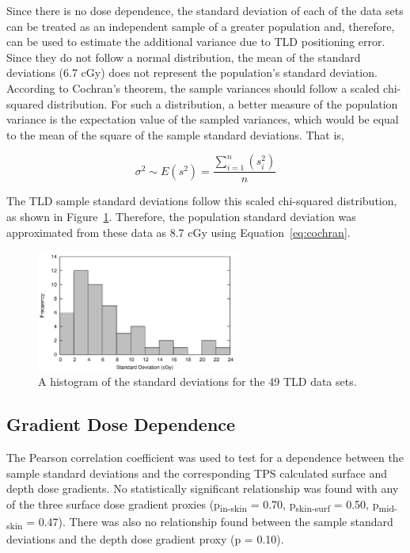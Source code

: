 Since there is no dose dependence, the standard deviation of each of the data sets can be treated as an independent sample of a greater population and, therefore, can be used to estimate the additional variance due to TLD positioning error. Since they do not follow a normal distribution, the mean of the standard deviations (6.7 cGy) does not represent the population’s standard deviation. According to Cochran’s theorem,\cite{Knight1999} the sample variances should follow a scaled chi-squared distribution. For such a distribution, a better measure of the population variance is the expectation value of the sampled variances, which would be equal to the mean of the square of the sample standard deviations. That is,

\begin{equation}
	\label{eq:cochran}
	\sigma^2 \sim E\left(s^2\right) = \frac{\sum_{i=1}^n \left(s_i^2\right)}{n}
\end{equation}

The TLD sample standard deviations follow this scaled chi-squared distribution, as shown in Figure~\ref{fig:p5-stdev_histogram}. Therefore, the population standard deviation was approximated from these data as 8.7 cGy using Equation~\ref{eq:cochran}.

\begin{figure}
	\centering \includegraphics[width=0.6\textwidth]{figures/p5-stdev_histogram.png}
	\caption[A histogram of the standard deviations for the 49 TLD data sets]{\label{fig:p5-stdev_histogram}A histogram of the standard deviations for the 49 TLD data sets.}
\end{figure}

\subsection{Gradient Dose Dependence}
The Pearson correlation coefficient was used to test for a dependence between the sample standard deviations and the corresponding TPS calculated surface and depth dose gradients. No statistically significant relationship was found with any of the three surface dose gradient proxies (p\textsubscript{in-skin} = 0.70, p\textsubscript{skin-surf} = 0.50, p\textsubscript{mid-skin} = 0.47). There was also no relationship found between the sample standard deviations and the depth dose gradient proxy (p = 0.10).

